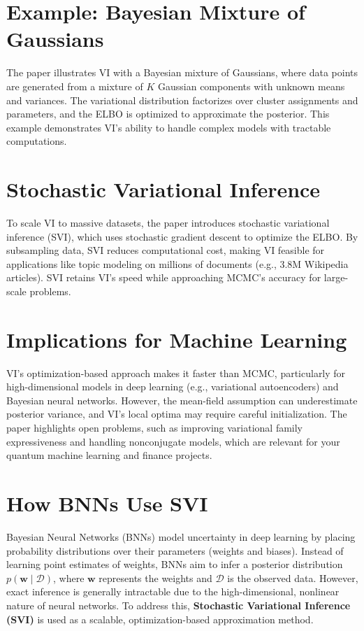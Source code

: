 \documentclass[11pt]{article}
\begin{document}
\section{Example: Bayesian Mixture of Gaussians}
The paper illustrates VI with a Bayesian mixture of Gaussians, where data points are generated from a mixture of $K$ Gaussian components with unknown means and variances. The variational distribution factorizes over cluster assignments and parameters, and the ELBO is optimized to approximate the posterior. This example demonstrates VI’s ability to handle complex models with tractable computations.

\section{Stochastic Variational Inference}
To scale VI to massive datasets, the paper introduces stochastic variational inference (SVI), which uses stochastic gradient descent to optimize the ELBO. By subsampling data, SVI reduces computational cost, making VI feasible for applications like topic modeling on millions of documents (e.g., 3.8M Wikipedia articles). SVI retains VI’s speed while approaching MCMC’s accuracy for large-scale problems.

\section{Implications for Machine Learning}
VI’s optimization-based approach makes it faster than MCMC, particularly for high-dimensional models in deep learning (e.g., variational autoencoders) and Bayesian neural networks. However, the mean-field assumption can underestimate posterior variance, and VI’s local optima may require careful initialization. The paper highlights open problems, such as improving variational family expressiveness and handling nonconjugate models, which are relevant for your quantum machine learning and finance projects.

\section{How BNNs Use SVI}

Bayesian Neural Networks (BNNs) model uncertainty in deep learning by placing probability distributions over their parameters (weights and biases). Instead of learning point estimates of weights, BNNs aim to infer a posterior distribution $p(\mathbf{w} \mid \mathcal{D})$, where $\mathbf{w}$ represents the weights and $\mathcal{D}$ is the observed data. However, exact inference is generally intractable due to the high-dimensional, nonlinear nature of neural networks. To address this, \textbf{Stochastic Variational Inference (SVI)} is used as a scalable, optimization-based approximation method.
\end{document}
